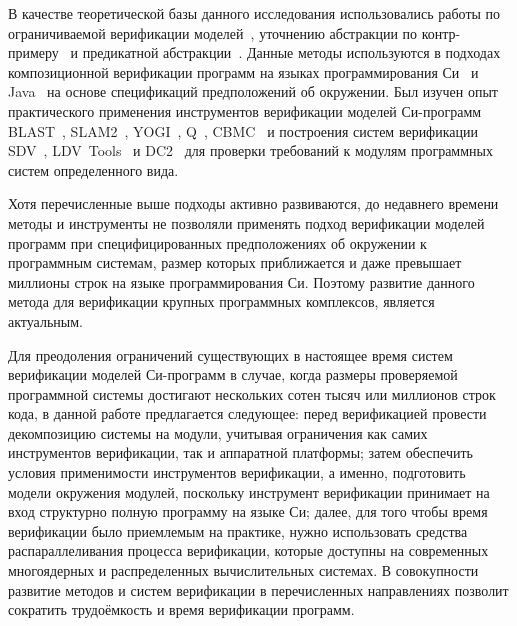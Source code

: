 \documentclass[%
candidate,
facsimile,  %
]{disser}
\newcommand{\IntroCite}{~\Cite}
\begin{document}
{В качестве теоретической базы данного исследования использовались работы по ограничиваемой верификации моделей\IntroCite{Biere03boundedmodel}, уточнению абстракции по контр-примеру\IntroCite{Clarke:2003:CAR} и предикатной абстракции\IntroCite{Flanagan:2002:PAS}.
Данные методы используются в подходах композиционной верификации программ на языках программирования Си\IntroCite{LTSA} и Java\IntroCite{Giannakopoulou:2004:AVS, Parizek:2007:SGE, Zhai:2016:AMG,parizek2007partial,Tkachuk:2003:AEG} на основе спецификаций предположений об окружении.
Был изучен опыт практического применения инструментов верификации моделей Си-программ BLAST\IntroCite{Henzinger:2003:SVB}, SLAM2\IntroCite{SLAM2}, YOGI\IntroCite{Yogi}, Q\IntroCite{Lal:2014:PSD}, CBMC\IntroCite{Clarke2004} и построения систем верификации SDV\IntroCite{Ball:2011:DSM}, LDV~Tools\IntroCite{Zakharov2015} и DC2\IntroCite{Ivancic:2015:SSS} для проверки требований к модулям программных систем определенного вида.

Хотя перечисленные выше подходы активно развиваются, до недавнего времени методы и инструменты не позволяли применять подход верификации моделей программ при специфицированных предположениях об окружении к программным системам, размер которых приближается и даже превышает миллионы строк на языке программирования Си.
Поэтому развитие данного метода для верификации крупных программных комплексов, является актуальным.

Для преодоления ограничений существующих в настоящее время систем верификации моделей Си-программ в случае, когда размеры проверяемой программной системы достигают нескольких сотен тысяч или миллионов строк кода, в данной работе предлагается следующее: перед верификацией провести декомпозицию системы на модули, учитывая ограничения как самих инструментов верификации, так и аппаратной платформы; затем обеспечить условия применимости инструментов верификации, а именно, подготовить модели окружения модулей, поскольку инструмент верификации принимает на вход структурно полную программу на языке Си; далее, для того чтобы время верификации было приемлемым на практике, нужно использовать средства распараллеливания процесса верификации, которые доступны на современных многоядерных и распределенных вычислительных системах. 
В совокупности развитие методов и систем верификации в перечисленных направлениях позволит сократить трудоёмкость и время верификации программ.
}
\end{document}
